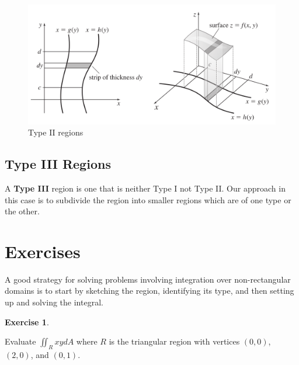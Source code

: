 \documentclass[
]{book}
\theoremstyle{definition}
\theoremstyle{definition}
\theoremstyle{definition}
\newtheorem{exercise}{Exercise}[chapter]
\theoremstyle{definition}
\theoremstyle{remark}
\begin{document}
\begin{figure}

{\centering \includegraphics[width=0.75\linewidth]{images/type-ii} 

}

\caption{Type II regions}\label{fig:unnamed-chunk-19}
\end{figure}

\hypertarget{type-iii-regions}{%
\subsection{Type III Regions}\label{type-iii-regions}}

A \textbf{Type III} region is one that is neither Type I not Type II. Our approach in this case is to subdivide the region into smaller regions which are of one type or the other.

\hypertarget{exercises}{%
\section{Exercises}\label{exercises}}

A good strategy for solving problems involving integration over non-rectangular domains is to start by sketching the region, identifying its type, and then setting up and solving the integral.

\begin{exercise}
\protect\hypertarget{exr:unlabeled-div-83}{}\label{exr:unlabeled-div-83}

Evaluate \(\displaystyle \iint_R xy dA\) where \(R\) is the triangular region with vertices \((0,0)\), \((2,0)\), and \((0,1)\).

\end{exercise}
\end{document}
